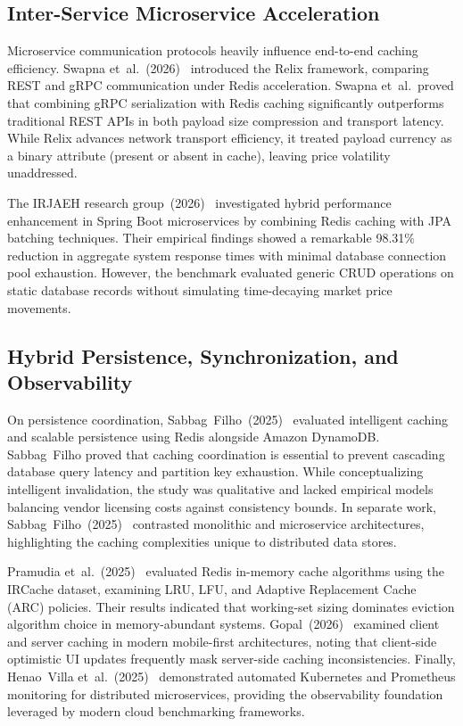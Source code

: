 \documentclass[11pt,a4paper]{article}
\begin{document}
\subsection{Inter-Service Microservice Acceleration}

Microservice communication protocols heavily influence end-to-end caching efficiency. Swapna et~al.\ (2026)~\cite{swapna2026} introduced the Relix framework, comparing REST and gRPC communication under Redis acceleration. Swapna et~al.\ proved that combining gRPC serialization with Redis caching significantly outperforms traditional REST APIs in both payload size compression and transport latency. While Relix advances network transport efficiency, it treated payload currency as a binary attribute (present or absent in cache), leaving price volatility unaddressed.

The IRJAEH research group~(2026)~\cite{irjaeh2026} investigated hybrid performance enhancement in Spring Boot microservices by combining Redis caching with JPA batching techniques. Their empirical findings showed a remarkable 98.31\% reduction in aggregate system response times with minimal database connection pool exhaustion. However, the benchmark evaluated generic CRUD operations on static database records without simulating time-decaying market price movements.

\subsection{Hybrid Persistence, Synchronization, and Observability}

On persistence coordination, Sabbag~Filho~(2025)~\cite{sabbag2025redis} evaluated intelligent caching and scalable persistence using Redis alongside Amazon DynamoDB. Sabbag~Filho proved that caching coordination is essential to prevent cascading database query latency and partition key exhaustion. While conceptualizing intelligent invalidation, the study was qualitative and lacked empirical models balancing vendor licensing costs against consistency bounds. In separate work, Sabbag~Filho~(2025)~\cite{sabbag2025mono} contrasted monolithic and microservice architectures, highlighting the caching complexities unique to distributed data stores.

Pramudia et~al.\ (2025)~\cite{pramudia2025} evaluated Redis in-memory cache algorithms using the IRCache dataset, examining LRU, LFU, and Adaptive Replacement Cache (ARC) policies. Their results indicated that working-set sizing dominates eviction algorithm choice in memory-abundant systems. Gopal~(2026)~\cite{gopal2026} examined client and server caching in modern mobile-first architectures, noting that client-side optimistic UI updates frequently mask server-side caching inconsistencies. Finally, Henao~Villa et~al.\ (2025)~\cite{henaovilla2025} demonstrated automated Kubernetes and Prometheus monitoring for distributed microservices, providing the observability foundation leveraged by modern cloud benchmarking frameworks.
\end{document}
